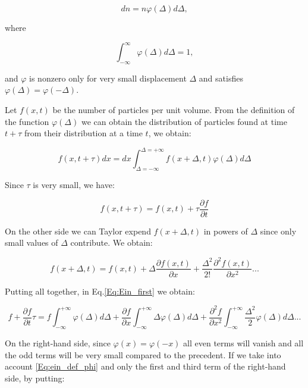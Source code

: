 \begin{equation}
	dn = n\varphi(\Delta)d\Delta,
\end{equation}

where

\begin{equation}
	\int_{-\infty} ^{\infty} \varphi (\Delta)d \Delta = 1,
	\label{Eq:ein_def_phi}
\end{equation}

and $\varphi$ is nonzero only for very small displacement $\Delta$ and satisfies $\varphi (\Delta) = \varphi (-\Delta)$.

Let $f(x,t)$ be the number of particles per unit volume. From the definition of the function $\varphi(\Delta)$ we can obtain the distribution of particles found at time $ t + \tau$ from their distribution at a time $t$, we obtain:

\begin{equation}
	f(x, t+\tau)dx = dx\int_{\Delta = -\infty} ^{\Delta = +\infty} f(x+\Delta, t) \varphi (\Delta) d\Delta
	\label{Eq:Ein_first}
\end{equation}

Since $\tau$ is very small, we have:

\begin{equation}
	f(x, t+\tau) = f(x,t) + \tau \frac{\partial f}{\partial t}
\end{equation}

On the other side we can Taylor expend $f(x+\Delta, t)$ in powers of $\Delta$ since only small values of $\Delta$ contribute. We obtain:

\begin{equation}
	f(x + \Delta, t) = f(x,t) + \Delta \frac{\partial f(x,t)}{\partial x} + \frac{\Delta ^2}{2!} \frac{\partial ^2 f(x,t)}{\partial x^2}...
\end{equation}

Putting all together, in Eq.\ref{Eq:Ein_first} we obtain:

\begin{equation}
	f + \frac{\partial f}{\partial t} \tau = f \int_{-\infty}^{+\infty} \varphi(\Delta)d \Delta + \frac{\partial f}{\partial x} \int_{-\infty}^{+\infty} \Delta \varphi (\Delta)d \Delta + \frac{\partial ^2 f}{\partial x^2} \int_{-\infty}^{+\infty} \frac{\Delta ^2}{2} \varphi(\Delta)d\Delta ...
	\label{Eq:ein_expended}
\end{equation}

On the right-hand side, since $\varphi(x) = \varphi(-x)$ all even terms will vanish and all the odd terms will be very small compared to the precedent. If we take into account \ref{Eq:ein_def_phi} and only the first and third term of the right-hand side, by putting:



